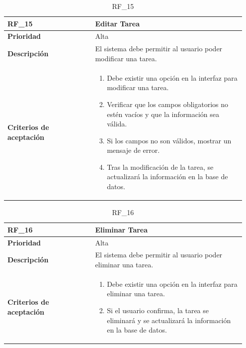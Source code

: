 \begin{table}[htb!]
    \begin{tabular}{|p{0.35\linewidth}|p{0.6\linewidth}|}
        \hline
        \rowcolor[HTML]{C0C0C0}  
        \textbf{RF\_15} & \textbf{Editar Tarea} \\
        \hline
        \textbf{Prioridad} & Alta \\
        \hline
        \textbf{Descripción} & El sistema debe permitir al usuario poder modificar una tarea.  \\
        \hline
        \vspace{0.5mm}
        \textbf{Criterios de aceptación} & 
        \begin{minipage}[t]{0.9\linewidth}
            \begin{enumerate}
                \item Debe existir una opción en la interfaz para modificar una tarea.
                \item Verificar que los campos obligatorios no estén vacíos y que la información sea válida.
                \item Si los campos no son válidos, mostrar un mensaje de error.
                \item Tras la modificación de la tarea, se actualizará la información en la base de datos.
            \end{enumerate}
            \vspace{2mm}
        \end{minipage} \\
        \hline
    \end{tabular}
    \caption{RF\_15}
    \label{req:RF15}
\end{table}

\begin{table}[htb!]
    \begin{tabular}{|p{0.35\linewidth}|p{0.6\linewidth}|}
        \hline
        \rowcolor[HTML]{C0C0C0}  
        \textbf{RF\_16} & \textbf{Eliminar Tarea} \\
        \hline
        \textbf{Prioridad} & Alta \\
        \hline
        \textbf{Descripción} & El sistema debe permitir al usuario poder eliminar una tarea.  \\
        \hline
        \vspace{0.5mm}
        \textbf{Criterios de aceptación} & 
        \begin{minipage}[t]{0.9\linewidth}
            \begin{enumerate}
                \item Debe existir una opción en la interfaz para eliminar una tarea.
                \item Si el usuario confirma, la tarea se eliminará y se actualizará la información en la base de datos.
            \end{enumerate}
            \vspace{2mm}
        \end{minipage} \\
        \hline
    \end{tabular}
    \caption{RF\_16}
    \label{req:RF16}
\end{table}

